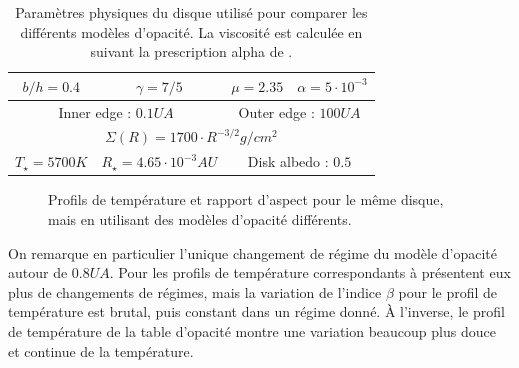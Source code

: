 \begin{table}[htb]
\centering
\begin{tabular}{|c|c|c|c|}
\hline
$b/h = 0.4$ & $\gamma = 7/5$ & $\mu = 2.35$ & $\alpha = 5\cdot 10^{-3}$ \\\hline
\multicolumn{2}{|c|}{Inner edge : $0.1\unit{UA}$} & \multicolumn{2}{c|}{Outer edge : $100\unit{UA}$}\\\hline
\multicolumn{4}{|c|}{$\Sigma(R) = 1700 \cdot R^{-3/2}\unit{g/cm^2}$}\\\hline
$T_\star = 5700\unit{K}$ & $R_\star = 4.65\cdot 10^{-3}\unit{AU}$ & \multicolumn{2}{c|}{Disk albedo : $0.5$}\\\hline
\end{tabular}
\caption{Paramètres physiques du disque utilisé pour comparer les différents modèles d'opacité. La viscosité est calculée en suivant la prescription alpha de
\cite{shakura1973black}.}\label{tab:opacity_disk_parameters}
\end{table}

\begin{figure}[htb]
\centering
{}\hfill
{}

\caption{Profils de température et rapport d'aspect pour le même disque, mais en utilisant des modèles d'opacité différents.}\label{fig:opacity_profiles}
\end{figure}

On remarque en particulier l'unique changement de régime du modèle d'opacité \cite{chambers2009analytic} autour de $0.8\unit{UA}$. Pour les profils de température correspondants à \cite{bell1994FU, zhu2009nonsteady} présentent eux plus de changements de régimes, mais la variation de l'indice $\beta$ pour le profil de température est brutal, puis constant dans un régime donné. À l'inverse, le profil de température de la table d'opacité \cite{hure2000transition} montre une variation beaucoup plus douce et continue de la température. 

